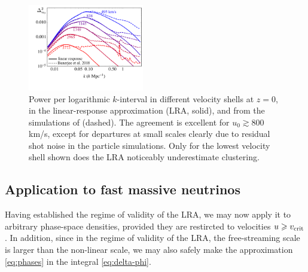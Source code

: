 \documentclass[useAMS, usenatbib]{mnras}
\newcommand{\spb}[1]{{\textcolor{green}{[{\bf SPB}: #1]}}}
\begin{document}
\begin{figure}
  \includegraphics[width=0.45\textwidth]{nuplots/banerjee_lin_resp.pdf}
  \caption{Power per logarithmic $k$-interval in different velocity shells at $z = 0$, in the linear-response approximation (LRA, solid), and from the simulations of \protect \cite{Banerjee_2018} (dashed). The agreement is excellent for $u_0 \gtrsim 800$ km/s, except for departures at small scales clearly due to residual shot noise in the particle simulations. Only for the lowest velocity shell shown does the LRA noticeably underestimate clustering.
  }
  \label{fig:simvshell}
\end{figure}


\subsection{Application to fast massive neutrinos}

Having established the regime of validity of the LRA, we may now apply it to arbitrary phase-space densities, provided they are restircted to velocities $u \geq v_{\rm crit}$. In addition, since in the regime of validity of the LRA, the free-streaming scale is larger than the non-linear scale, we may also safely make the approximation \eqref{eq:phases} in the integral \eqref{eq:delta-phi}.
\end{document}

